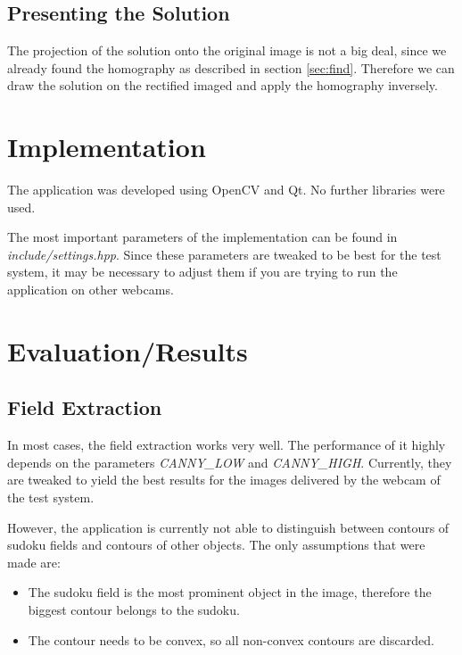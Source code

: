 \documentclass[
a4paper,     %
12pt         %
]{scrartcl}  %
\begin{document}
\subsection{Presenting the Solution}

The projection of the solution onto the original image is not a big deal, since we already
found the homography as described in section \ref{sec:find}. Therefore we can draw the solution
on the rectified imaged and apply the homography inversely.

\section{Implementation}

The application was developed using OpenCV and Qt. No further libraries were used.

The most important parameters of the implementation can be found in \emph{include/settings.hpp}.
Since these parameters are tweaked to be best for the test system, it may be necessary to
adjust them if you are trying to run the application on other webcams. 

\section{Evaluation/Results}
\label{sec:results}

\subsection{Field Extraction}

In most cases, the field extraction works very well. The performance of it highly depends on the 
parameters \emph{CANNY\_LOW} and \emph{CANNY\_HIGH}. Currently, they are tweaked to yield the best
results for the images delivered by the webcam of the test system.

However, the application is currently not able to distinguish between contours of sudoku fields and
contours of other objects. The only assumptions that were made are:

\begin{itemize}
  \item The sudoku field is the most prominent object in the image, therefore the biggest contour
  belongs to the sudoku.
  \item The contour needs to be convex, so all non-convex contours are discarded.
\end{itemize}
\end{document}
